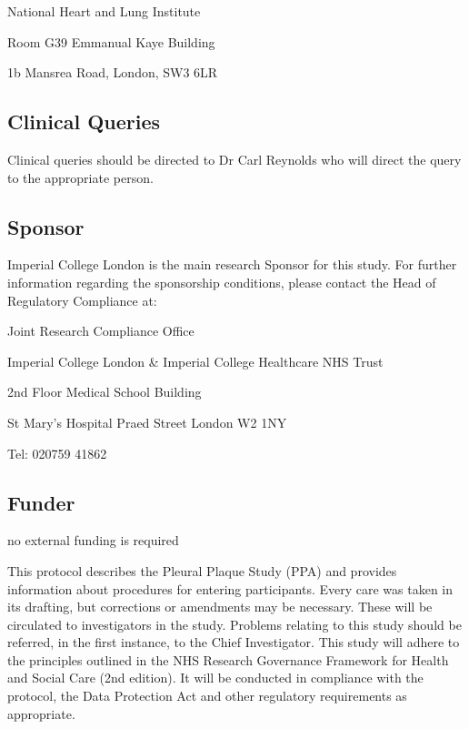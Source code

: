 \documentclass[a4paper,10pt]{article}
\begin{document}
\begin{flushleft}
National Heart and Lung Institute

Room G39 Emmanual Kaye Building

1b Mansrea Road, London, SW3 6LR 


\subsection*{Clinical Queries}

Clinical queries should be directed to Dr Carl Reynolds who will direct the query to the appropriate person.

\subsection*{Sponsor}

Imperial College London is the main research Sponsor for this study. For further information regarding the sponsorship conditions, please contact the Head of Regulatory Compliance at:\vspace{0.5cm}
		
Joint Research Compliance Office

Imperial College London \& Imperial College Healthcare NHS Trust

2nd Floor Medical School Building

St Mary’s Hospital
Praed Street
London
W2 1NY

Tel: 020759 41862

\subsection*{Funder}


no external funding is required \vspace{0.5cm}

\end{flushleft}


This protocol describes the Pleural Plaque Study (PPA) and provides information about procedures for entering participants. Every care was taken in its drafting, but corrections or amendments may be necessary. These will be circulated to investigators in the study. Problems relating to this study should be referred, in the first instance, to the Chief Investigator. This study will adhere to the principles outlined in the NHS Research Governance Framework for Health and Social Care (2nd edition). It will be conducted in compliance with the protocol, the Data Protection Act and other regulatory requirements as appropriate. 
\end{document}
